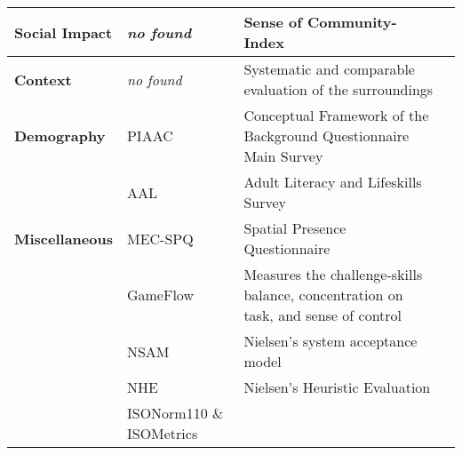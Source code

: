 \begin{tabular}{p{3.5cm}p{4.5cm}p{7.5cm}c}
\textbf{Social Impact} & \textit{no found} & Sense of Community-Index & \cite{Ballagas2005, cheverst2005hermes, Cheverst2008}   \\ \hline



\textbf{Context} & \textit{no found} & Systematic and comparable evaluation of the surroundings &   \\ \hline



\textbf{Demography} & PIAAC & Conceptual Framework of the Background Questionnaire Main Survey & \\
& AAL & Adult Literacy and Lifeskills Survey & \cite{SurveysAAL} \\ \hline




\textbf{Miscellaneous} & MEC-SPQ \cite{MECSPEQQuestionnaire} & Spatial Presence Questionnaire & \cite{Huang2004, jacucci2010worldsofinformation}   \\
& GameFlow \cite{sweetser2005gameflow} & Measures the challenge-skills balance, concentration on task, and sense of control
 & \cite{Huang2004}  \\
& NSAM & Nielsen's system acceptance model & \cite{ojala2010ubi, jacucci2010worldsofinformation}  \\
& NHE \cite{nielsen1994usability} & Nielsen's Heuristic Evaluation & \\
& ISONorm110 \& ISOMetrics  & & \cite{Chur2014Questionnaires} \\


\bottomrule
\end{tabular}

